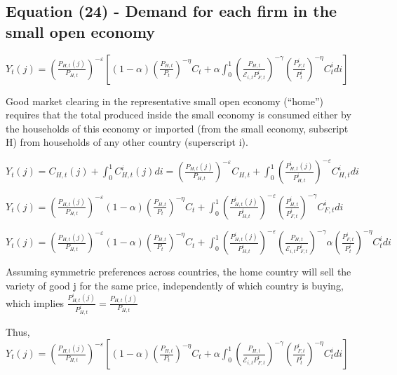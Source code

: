 \documentclass[
]{article}
\begin{document}
\vspace{12pt}

\hypertarget{equation-24---demand-for-each-firm-in-the-small-open-economy}{%
\subsection{Equation (24) - Demand for each firm in the small open
economy}\label{equation-24---demand-for-each-firm-in-the-small-open-economy}}

\(\displaystyle Y_t(j) = \left( \frac{P_{H,t}(j)}{P_{H,t}}\right)^{-\varepsilon} \left[ (1-\alpha)\left( \frac{P_{H,t}}{P_t} \right)^{-\eta}C_t + \alpha \int_0^1 \left( \frac{P_{H,t}}{\mathcal{E}_{i,t}P_{F,t}^i}\right)^{-\gamma} \left( \frac{P_{F,t}^i}{P_t^i} \right)^{-\eta} C_t^i di \right]\)

\vspace{8pt}

Good market clearing in the representative small open economy (``home'')
requires that the total produced inside the small economy is consumed
either by the households of this economy or imported (from the small
economy, subscript H) from households of any other country (superscript
i).

\(\displaystyle Y_t(j) = C_{H,t}(j)+\int_0^1 C_{H,t}^i(j)di = \left( \frac{P_{H,t}(j)}{P_{H,t}}\right)^{-\varepsilon}C_{H,t} + \int_0^1 \displaystyle \left( \frac{P_{H,t}^i(j)}{P_{H,t}^i}\right)^{-\varepsilon}C_{H,t}^i di\)

\(\displaystyle Y_t(j) = \left( \frac{P_{H,t}(j)}{P_{H,t}}\right)^{-\varepsilon} (1-\alpha)\left( \frac{P_{H,t}}{P_t} \right)^{-\eta}C_t + \int_0^1 \left( \frac{P_{H,t}^i(j)}{P_{H,t}^i}\right)^{-\varepsilon} \left( \frac{P_{H,t}^i}{P_{F,t}^i}\right)^{-\gamma}C_{F,t}^i di\)

\(\displaystyle Y_t(j) = \left( \frac{P_{H,t}(j)}{P_{H,t}}\right)^{-\varepsilon} (1-\alpha)\left( \frac{P_{H,t}}{P_t} \right)^{-\eta}C_t + \int_0^1 \left( \frac{P_{H,t}^i(j)}{P_{H,t}^i}\right)^{-\varepsilon} \left( \frac{P_{H,t}}{\mathcal{E}_{i,t}P_{F,t}^i}\right)^{-\gamma} \alpha \left( \frac{P_{F,t}^i}{P_t^i} \right)^{-\eta} C_t^i di\)

Assuming symmetric preferences across countries, the home country will
sell the variety of good j for the same price, independently of which
country is buying, which implies
\(\displaystyle \frac{P_{H,t}^i (j)}{P_{H,t}^i}=\frac{P_{H,t} (j)}{P_{H,t}}\)

Thus,
\(\displaystyle Y_t(j) = \left( \frac{P_{H,t}(j)}{P_{H,t}}\right)^{-\varepsilon} \left[ (1-\alpha)\left( \frac{P_{H,t}}{P_t} \right)^{-\eta}C_t + \alpha \int_0^1 \left( \frac{P_{H,t}}{\mathcal{E}_{i,t}P_{F,t}^i}\right)^{-\gamma} \left( \frac{P_{F,t}^i}{P_t^i} \right)^{-\eta} C_t^i di \right]\)
\end{document}

